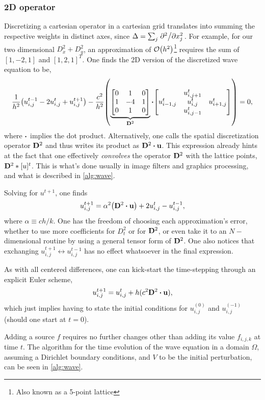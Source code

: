 \documentclass[letterpaper,12pt]{article}
\begin{document}
\subsubsection{2D operator}
Discretizing a cartesian operator in a cartesian grid translates into summing the respective weights in distinct axes, since $\Delta=\sum_j\pdv*[2]{x_j}$. For example, for our two dimensional $D^2_x+D^2_y$, an approximation of $\order{h^2}$\footnote{Also known as a 5-point lattice} requires the sum of $[1,-2,1]$ and $[1,2,1]^T$. One finds the 2D version of the discretized wave equation to be,
\begin{equation}
  \frac{1}{h^2}\qty(u_{i,j}^{t-1}-2u_{i,j}^{t}+u_{i,j}^{t+1})-\frac{c^2}{h^2}\qty(\underbrace{\mqty[0& 1 & 0\\1&-4&1\\0&1&0]}_{\vb{D}^2}\vdot\mqty[ & u^t_{i,j+1} & \\ u^t_{i-1,j} & u^t_{i,j} & u^t_{i+1,j}\\& u^t_{i,j-1} &] )=0,
\end{equation}
where $\vdot$ implies the dot product. Alternatively, one calls the spatial discretization operator $\vb{D}^2$ and thus writes its product as $\vb{D}^2\vdot\vb{u}$. This expression already hints at the fact that one effectively \emph{convolves} the operator $\vb{D}^2$ with the lattice points, $\vb{D}^2\ast [u]^t$. This is what's done usually in image filters and graphics processing, and what is described in \autoref{alg:wave}.

Solving for $u^{t+1}$, one finds
\begin{equation}
  u_{i,j}^{t+1}=\alpha^2\qty(\vb{D}^2\vdot \vb{u})+2u_{i,j}^t - u_{i,j}^{t-1},
\end{equation}
where $\alpha\equiv ch/k$. One has the freedom of choosing each approximation's error, whether to use more coefficients for $D_t^2$ or for $\vb{D}^2$, or even take it to an $N-$dimensional routine by using a general tensor form of $\vb{D}^2$. One also notices that exchanging $u_{i,j}^{t+1}\leftrightarrow u_{i,j}^{t-1}$ has no effect whatsoever in the final expression.

As with all centered differences, one can kick-start the time-stepping through an explicit Euler scheme,
\[u_{i,j}^{t+1}=u_{i,j}^t+h(c^2\vb{D}^2\vdot \vb{u}),\]
which just implies having to state the initial conditions for $u_{i,j}^{(0)}$ and $u_{i,j}^{(-1)}$ (should one start at $t=0$).
 
Adding a source $f$ requires no further changes other than adding its value $f_{i,j,k}$ at time $t$. The algorithm for the time evolution of the wave equation in a domain $\Omega$, assuming a Dirichlet boundary conditions, and $V$ to be the initial perturbation, can be seen in \autoref{alg:wave}.
\end{document}
